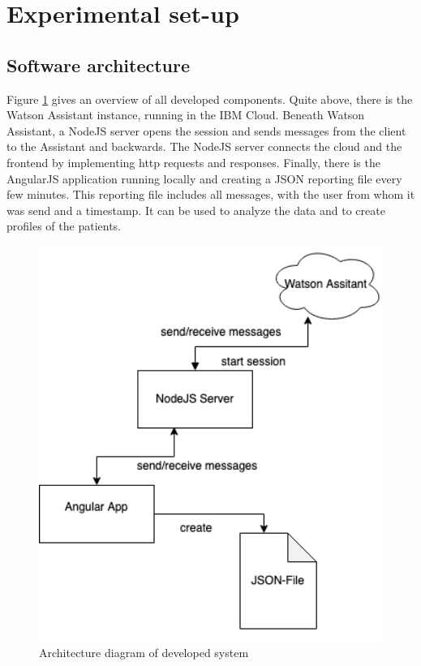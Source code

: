 \section{Experimental set-up}

\subsection{Software architecture}

Figure \ref{architecture_0102} gives an overview of all developed components. Quite above, there is the Watson Assistant instance, running in the IBM Cloud. Beneath Watson Assistant, a NodeJS server opens the session and sends messages from the client to the Assistant and backwards. The NodeJS server connects the cloud and the frontend by implementing \ac{http} requests and responses. Finally, there is the AngularJS application running locally and creating a \ac{JSON} reporting file every few minutes. This reporting file includes all messages, with the user from whom it was send and a timestamp. It can be used to analyze the data and to create profiles of the patients.

\begin{figure}[htbp]
	\centering
	\includegraphics[width=1\textwidth]{images/architecture_0102.png}
	\caption{Architecture diagram of developed system}
	\label{architecture_0102}
\end{figure}


